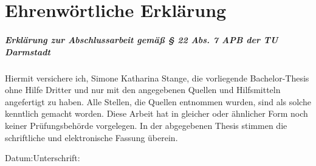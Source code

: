 	\chapter*{Ehrenwörtliche Erklärung}
	\vspace{11pt}
	\paragraph{Erklärung zur Abschlussarbeit gemäß § 22 Abs. 7 APB der TU Darmstadt}
	\vspace{11pt}
	\noindent Hiermit versichere ich, Simone Katharina Stange, die vorliegende Bachelor-Thesis ohne Hilfe Dritter und nur mit den angegebenen Quellen und Hilfsmitteln angefertigt zu haben. Alle Stellen, die Quellen entnommen wurden, sind als solche kenntlich gemacht worden. Diese Arbeit hat in gleicher oder ähnlicher Form noch keiner Prüfungsbehörde vorgelegen. \newline
	In der abgegebenen Thesis stimmen die schriftliche und elektronische Fassung überein.\vspace{40pt}
	
	\noindent Datum:\hspace{0.4\textwidth}Unterschrift:
	\vspace*{2cm}	